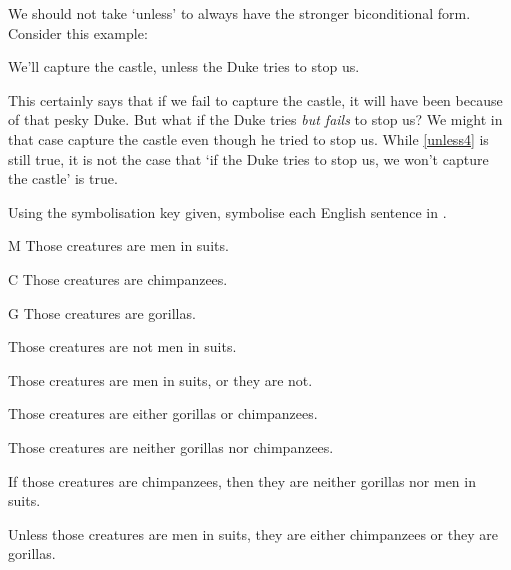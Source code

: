 We should not take `unless' to always have the stronger biconditional form. Consider this example: 
\begin{earg}
\item[\ex{unless4}] We'll capture the castle, unless the Duke tries to stop us.
\end{earg} This certainly says that if we fail to capture the castle, it will have been because of that pesky Duke. But what if the Duke tries \emph{but fails} to stop us? We might in that case capture the castle even though he tried to stop us. While \ref{unless4} is still true, it is not the case that `if the Duke tries to stop us, we won't capture the castle' is true.



\practiceproblems
\problempart Using the symbolisation key given, symbolise each English sentence in \TFL.\label{pr.monkeysuits}
	\begin{ekey}
		\item[M] Those creatures are men in suits. 
		\item[C] Those creatures are chimpanzees. 
		\item[G] Those creatures are gorillas.
	\end{ekey}
\begin{earg}
\item Those creatures are not men in suits.
\item Those creatures are men in suits, or they are not.
\item Those creatures are either gorillas or chimpanzees.
\item Those creatures are neither gorillas nor chimpanzees.
\item If those creatures are chimpanzees, then they are neither gorillas nor men in suits.
\item Unless those creatures are men in suits, they are either chimpanzees or they are gorillas.
\end{earg}

